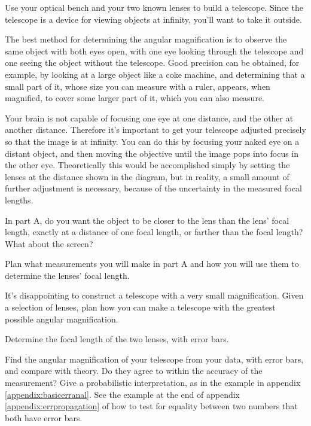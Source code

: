 
Use your optical bench and your two known lenses to build a
telescope.
 Since the telescope is a device for viewing objects
at infinity, you'll want to take it outside.

The best method for determining the angular magnification
is to observe the same object with both eyes open, with one
eye looking through the telescope and one seeing the object
without the telescope. Good precision can be obtained, for
example, by looking at a large object like a coke machine,
and determining that a small part of it, whose size you
can measure with a ruler, appears, when magnified, to cover some larger part
of it, which you can also measure. 

Your brain is not capable of focusing one eye at one distance, and
the other at another distance. Therefore it's important to get your
telescope adjusted precisely so that the image is at infinity.
You can do this by focusing your naked eye on a distant object, and
then moving the objective until the image pops into focus in the
other eye. Theoretically this would be accomplished simply by setting
the lenses at the distance shown in the diagram, but in reality,
a small amount of further adjustment is necessary, because of the
uncertainty in the measured focal lengths.


\prelab

\prelabquestion  In part A, do you want the object to be closer to the
lens than the lens' focal length, exactly at a distance of
one focal length, or farther than the focal length?
What about the screen?

\prelabquestion  Plan what measurements you will make in part A and how
you will use them to determine the lenses' focal length.

\prelabquestion
It's disappointing to construct a telescope with
a very small magnification. Given a selection of lenses, plan
how you can make a telescope with the greatest possible
angular magnification.

\analysis

Determine the focal length of the two lenses, with error bars.

Find the angular magnification of your telescope from your
data, with error bars, and compare with theory. Do they
agree to within the accuracy of the measurement?
Give a probabilistic interpretation, as in the example
in appendix \ref{appendix:basicerranal}.
See the example at the end of appendix \ref{appendix:errpropagation} of how to
test for equality between two numbers that both have error bars.
